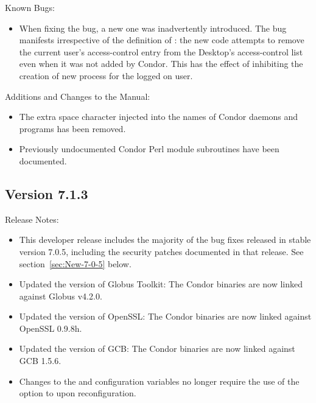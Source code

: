 \noindent Known Bugs:

\begin{itemize}

\item When fixing the  bug, a new one was
inadvertently introduced.  The bug manifests irrespective of the definition
of : the new code attempts to remove the current 
user's access-control entry from the Desktop's access-control list even when
it was not added by Condor.  This has the effect of inhibiting the creation
of new process for the logged on user.

\end{itemize}

\noindent Additions and Changes to the Manual:

\begin{itemize}

\item The extra space character injected into the names of Condor
daemons and programs has been removed.

\item Previously undocumented Condor Perl module subroutines have
been documented.

\end{itemize}



\subsection*{\label{sec:New-7-1-3}Version 7.1.3}

\noindent Release Notes:

\begin{itemize}

\item This developer release includes the majority of the bug fixes released
	in stable version 7.0.5, including the security patches documented in that
	release.  See section~\ref{sec:New-7-0-5} below.

\item Updated the version of Globus Toolkit: The Condor binaries are now
	linked against Globus v4.2.0.

\item Updated the version of OpenSSL: The Condor binaries are now linked
	against OpenSSL 0.9.8h.

\item Updated the version of GCB: The Condor binaries are now linked
	against GCB 1.5.6.

\item Changes to the  and  configuration
	variables no longer require the use of the  option to
	 upon reconfiguration.

\end{itemize}

